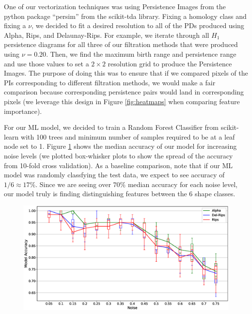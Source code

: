 \documentclass[letterpaper,titlepage]{article}
\begin{document}
    One of our vectorization techniques was using Persistence Images from the python package ``persim'' from the scikit-tda library. Fixing a homology class and fixing a $\nu$, we decided to fit a desired resolution to all of the PDs produced using Alpha, Rips, and Delaunay-Rips. For example, we iterate through all $H_1$ persistence diagrams for all three of our filtration methods that were produced using $\nu=0.20$. Then, we find the maximum birth range and persistence range and use those values to set a $2\times2$ resolution grid to produce the Persistence Images. The purpose of doing this was to ensure that if we compared pixels of the PIs corresponding to different filtration methods, we would make a fair comparison because corresponding persistence pairs would land in corresponding pixels (we leverage this design in Figure \ref{fig:heatmaps} when comparing feature importance).
    
    For our ML model, we decided to train a Random Forest Classifier from scikit-learn with 100 trees and minimum number of samples required to be at a leaf node set to 1. Figure \ref{fig:accuracy_v_noise} shows the median accuracy of our model for increasing noise levels (we plotted box-whisker plots to show the spread of the accuracy from 10-fold cross validation). As a baseline comparison, note that if our ML model was randomly classfying the test data, we expect to see accuracy of $1/6 \approx 17\%$. Since we are seeing over $70\%$ median accuracy for each noise level, our model truly is finding distinguishing features between the 6 shape classes.
    \begin{figure}[ht!]
        \centering
        \includegraphics[width=\columnwidth]{figures/model_accuracy_v_noise.eps}
        \caption{}
        \label{fig:accuracy_v_noise}
    \end{figure}
    
\end{document}
